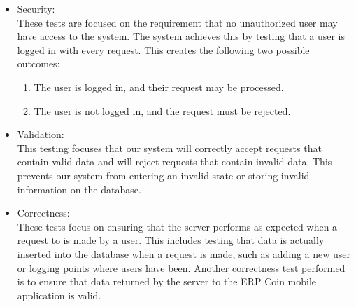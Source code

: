 \documentclass{article}
\begin{document}
\begin{itemize}
\item Security: \\
These tests are focused on the requirement that no unauthorized user may have access to the system. The system achieves this by testing that a user is logged in with every request. This creates the following two possible outcomes:
\begin{enumerate}
    \item The user is logged in, and their request may be processed.
    \item The user is not logged in, and the request must be rejected.
\end{enumerate}

\item Validation:\\
This testing focuses that our system will correctly accept requests that contain valid data and will reject requests that contain invalid data. This prevents our system from entering an invalid state or storing invalid information on the database. 

\item Correctness:\\
These tests focus on ensuring that the server performs as expected when a request to is made by a user. This includes testing that data is actually inserted into the database when a request is made, such as adding a new user or logging points where users have been. Another correctness test performed is to ensure that data returned by the server to the ERP Coin mobile application is valid.
\\ \\
\end{itemize}
\end{document}
